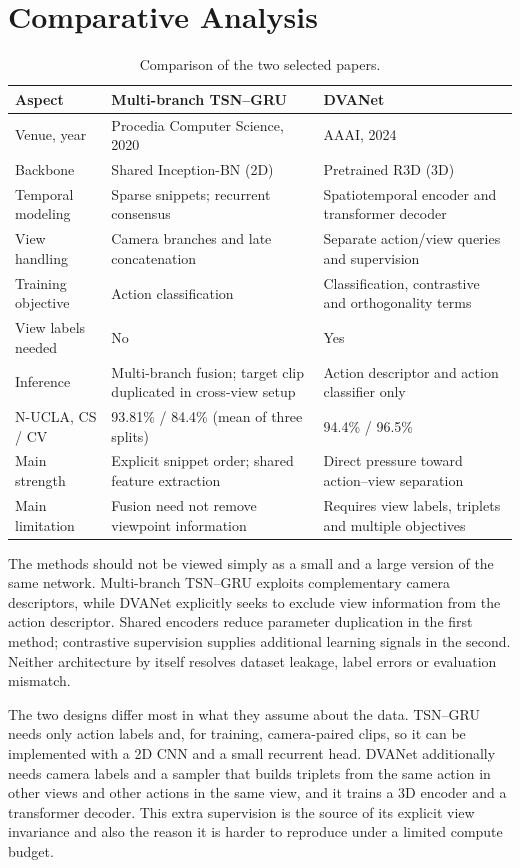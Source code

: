 \documentclass[runningheads]{llncs}
\begin{document}
\section{Comparative Analysis}\label{sec:comp}
\begin{table}[tb]
\caption{Comparison of the two selected papers.}\label{tab:comp}
\centering\small
\begin{tabular}{@{}p{2.8cm}p{4.5cm}p{4.5cm}@{}}
\toprule
Aspect & Multi-branch TSN--GRU~\cite{bui} & DVANet~\cite{dva}\\\midrule
Venue, year & Procedia Computer Science, 2020 & AAAI, 2024\\
Backbone & Shared Inception-BN (2D) & Pretrained R3D (3D)\\
Temporal modeling & Sparse snippets; recurrent consensus & Spatiotemporal encoder and transformer decoder\\
View handling & Camera branches and late concatenation & Separate action/view queries and supervision\\
Training objective & Action classification & Classification, contrastive and orthogonality terms\\
View labels needed & No & Yes\\
Inference & Multi-branch fusion; target clip duplicated in cross-view setup & Action descriptor and action classifier only\\
N-UCLA, CS / CV & 93.81\% / 84.4\% (mean of three splits) & 94.4\% / 96.5\%\\
Main strength & Explicit snippet order; shared feature extraction & Direct pressure toward action--view separation\\
Main limitation & Fusion need not remove viewpoint information & Requires view labels, triplets and multiple objectives\\\bottomrule
\end{tabular}
\end{table}

The methods should not be viewed simply as a small and a large version of the same network. Multi-branch TSN--GRU exploits complementary camera descriptors, while DVANet explicitly seeks to exclude view information from the action descriptor. Shared encoders reduce parameter duplication in the first method; contrastive supervision supplies additional learning signals in the second. Neither architecture by itself resolves dataset leakage, label errors or evaluation mismatch.

The two designs differ most in what they assume about the data. TSN--GRU needs only action labels and, for training, camera-paired clips, so it can be implemented with a 2D CNN and a small recurrent head. DVANet additionally needs camera labels and a sampler that builds triplets from the same action in other views and other actions in the same view, and it trains a 3D encoder and a transformer decoder. This extra supervision is the source of its explicit view invariance and also the reason it is harder to reproduce under a limited compute budget.
\end{document}
